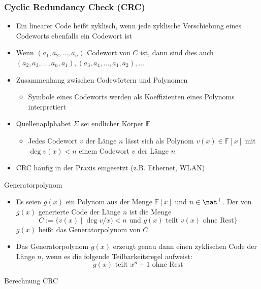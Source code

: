     \subsubsection{Cyclic Redundancy Check (CRC)}
      \begin{itemize}
        \item Ein linearer Code heißt zyklisch, wenn jede zyklische Verschiebung eines Codeworts
          ebenfalls ein Codewort ist
        \item Wenn $(a_1,a_2,\dots,a_n)$ Codewort von $C$ ist, dann sind dies auch\\
          $(a_2,a_3,\dots,a_n,a_1),(a_3,a_4,\dots,a_1,a_2),\dots$
        \item Zusammenhang zwischen Codewörtern und Polynomen
          \begin{itemize}
            \item Symbole eines Codeworts werden als Koeffizienten eines Polynoms interpretiert
          \end{itemize}
          \item Quellenaplphabet $\Sigma$ sei endlicher Körper $\mathbb{F}$
            \begin{itemize}
              \item Jedes Codewort $v$ der Länge $n$ lässt sich als Polynom $v(x)\in\mathbb{F}[x]$
                mit $\deg v(x)<n$ einem Codewort $v$ der Länge $n$
            \end{itemize}
          \item CRC häufig in der Praxis eingesetzt (z.B. Ethernet, WLAN)
      \end{itemize}
      Generatorpolynom
      \begin{itemize}
        \item Es seien $g(x)$ ein Polynom aus der Menge $\mathbb{F}[x]$ und $n\in\nat^+$. Der von
          $g(x)$ generierte Code der Länge $n$ ist die Menge
          $$C:=\{v(x)\mid\deg v/x)<n\text{ und }g(x)\text{ teilt }v(x)\text{ ohne Rest}\}$$
          $g(x)$ heißt das Generatorpolynom von $C$
        \item Das Generatorpolynom $g(x)$ erzeugt genau dann einen zyklischen Code der Länge $n$, wenn
          es die folgende Teilbarkeitsregel aufweist:
          $$g(x)\text{ teilt }x^n+1\text{ ohne Rest}$$
      \end{itemize}
      Berechnung CRC
